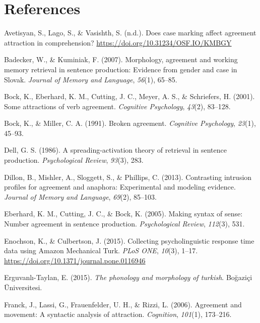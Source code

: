 \documentclass[english,doc]{apa6}
\begin{document}
\hypertarget{references}{%
\section*{References}\label{references}}

\hypertarget{refs}{}
\leavevmode\hypertarget{ref-AvetisyanEtAl:2019}{}%
Avetisyan, S., Lago, S., \& Vasishth, S. (n.d.). Does case marking affect agreement attraction in comprehension? \url{https://doi.org/10.31234/OSF.IO/KMBGY}

\leavevmode\hypertarget{ref-BadeckerKuminiak:2007}{}%
Badecker, W., \& Kuminiak, F. (2007). Morphology, agreement and working memory retrieval in sentence production: Evidence from gender and case in Slovak. \emph{Journal of Memory and Language}, \emph{56}(1), 65--85.

\leavevmode\hypertarget{ref-Bock2001}{}%
Bock, K., Eberhard, K. M., Cutting, J. C., Meyer, A. S., \& Schriefers, H. (2001). Some attractions of verb agreement. \emph{Cognitive Psychology}, \emph{43}(2), 83--128.

\leavevmode\hypertarget{ref-Bock1991}{}%
Bock, K., \& Miller, C. A. (1991). Broken agreement. \emph{Cognitive Psychology}, \emph{23}(1), 45--93.

\leavevmode\hypertarget{ref-Dell1986}{}%
Dell, G. S. (1986). A spreading-activation theory of retrieval in sentence production. \emph{Psychological Review}, \emph{93}(3), 283.

\leavevmode\hypertarget{ref-Dillon2013}{}%
Dillon, B., Mishler, A., Sloggett, S., \& Phillips, C. (2013). Contrasting intrusion profiles for agreement and anaphora: Experimental and modeling evidence. \emph{Journal of Memory and Language}, \emph{69}(2), 85--103.

\leavevmode\hypertarget{ref-Eberhard2005}{}%
Eberhard, K. M., Cutting, J. C., \& Bock, K. (2005). Making syntax of sense: Number agreement in sentence production. \emph{Psychological Review}, \emph{112}(3), 531.

\leavevmode\hypertarget{ref-EnochsonCulbertson:2015}{}%
Enochson, K., \& Culbertson, J. (2015). Collecting psycholinguistic response time data using Amazon Mechanical Turk. \emph{PLoS ONE}, \emph{10}(3), 1--17. \url{https://doi.org/10.1371/journal.pone.0116946}

\leavevmode\hypertarget{ref-Taylan2015}{}%
Erguvanlı-Taylan, E. (2015). \emph{The phonology and morphology of turkish}. Boğaziçi Üniversitesi.

\leavevmode\hypertarget{ref-Franck2006}{}%
Franck, J., Lassi, G., Frauenfelder, U. H., \& Rizzi, L. (2006). Agreement and movement: A syntactic analysis of attraction. \emph{Cognition}, \emph{101}(1), 173--216.
\end{document}
